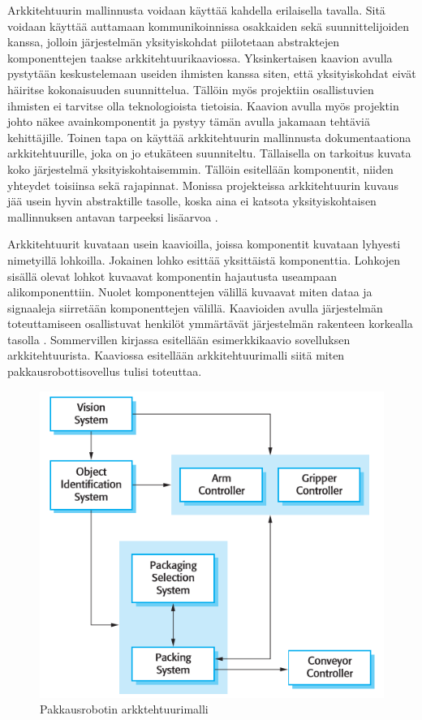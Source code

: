 \documentclass[utf8]{gradu3}
\begin{document}
Arkkitehtuurin mallinnusta voidaan käyttää kahdella erilaisella tavalla. Sitä voidaan käyttää auttamaan kommunikoinnissa osakkaiden sekä suunnittelijoiden kanssa, jolloin järjestelmän yksityiskohdat piilotetaan abstraktejen komponenttejen taakse arkkitehtuurikaaviossa. Yksinkertaisen kaavion avulla pystytään keskustelemaan useiden ihmisten kanssa siten, että yksityiskohdat eivät häiritse kokonaisuuden suunnittelua. Tällöin myös projektiin osallistuvien ihmisten ei tarvitse olla teknologioista tietoisia. Kaavion avulla myös projektin johto näkee avainkomponentit ja pystyy tämän avulla jakamaan tehtäviä kehittäjille. Toinen tapa on käyttää arkkitehtuurin mallinnusta dokumentaationa arkkitehtuurille, joka on jo etukäteen suunniteltu. Tällaisella on tarkoitus kuvata koko järjestelmä yksityiskohtaisemmin. Tällöin esitellään komponentit, niiden yhteydet toisiinsa sekä rajapinnat. Monissa projekteissa arkkitehtuurin kuvaus jää usein hyvin abstraktille tasolle, koska aina ei katsota yksityiskohtaisen mallinnuksen antavan tarpeeksi lisäarvoa \parencite[s. 150]{Sommerville}.

Arkkitehtuurit kuvataan usein kaavioilla, joissa komponentit kuvataan lyhyesti nimetyillä lohkoilla. Jokainen lohko esittää yksittäistä komponenttia. Lohkojen sisällä olevat lohkot kuvaavat komponentin hajautusta useampaan alikomponenttiin. Nuolet komponenttejen välillä kuvaavat miten dataa ja signaaleja siirretään komponenttejen välillä. Kaavioiden avulla järjestelmän toteuttamiseen osallistuvat henkilöt ymmärtävät järjestelmän rakenteen korkealla tasolla \parencite[s. 150]{Sommerville}. Sommervillen kirjassa esitellään esimerkkikaavio sovelluksen arkkitehtuurista. Kaaviossa esitellään arkkitehtuurimalli siitä miten pakkausrobottisovellus tulisi toteuttaa.

\begin{figure}[h]
\centering
\includegraphics[scale=0.85]{architecture.png}
\caption{Pakkausrobotin arkktehtuurimalli \parencite[s.149]{Sommerville}}
\end{figure}
\end{document}
